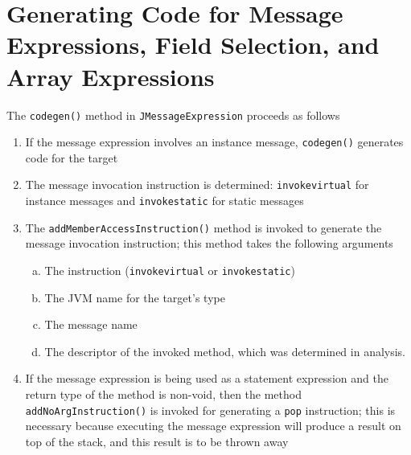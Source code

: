 \documentclass[8pt,a4paper,compress]{beamer}
\begin{document}
\section{Generating Code for Message Expressions, Field Selection, and Array Expressions}
\begin{frame}[fragile]
\pause

The \lstinline{codegen()} method in \lstinline{JMessageExpression} proceeds as follows
\begin{enumerate}
\item If the message expression involves an instance message, \lstinline{codegen()} generates code for the target
\item The message invocation instruction is determined: \lstinline{invokevirtual} for instance messages and \lstinline{invokestatic} for static messages
\item The \lstinline{addMemberAccessInstruction()} method is invoked to generate the message invocation instruction; this method takes the following arguments
\begin{enumerate}[(a)]
\item The instruction (\lstinline{invokevirtual} or \lstinline{invokestatic})
\item The JVM name for the target's type
\item The message name
\item The descriptor of the invoked method, which was determined in analysis.
\end{enumerate}
\item If the message expression is being used as a statement expression and the return type of the method  is non-void, then the method \lstinline{addNoArgInstruction()} is invoked for generating a \lstinline{pop} instruction; this is necessary because executing the message expression will produce a result on top of the stack, and this result is to be thrown away
\end{enumerate}
\end{frame}
\end{document}
